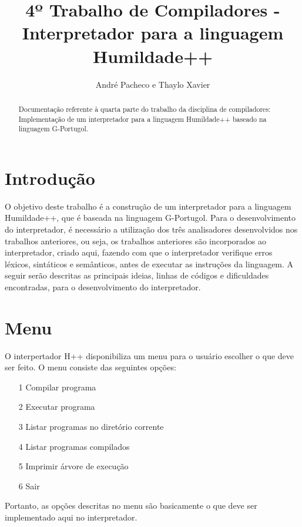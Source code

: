 \documentclass[a4paper,10pt]{article}
\title{4º Trabalho de Compiladores - Interpretador para a linguagem Humildade++}
\author{André Pacheco e Thaylo Xavier}
\begin{document}
\maketitle

\begin{abstract}
Documentação referente à quarta parte do trabalho da disciplina de compiladores: Implementação de um interpretador para a linguagem Humildade++ baseado na linguagem G-Portugol.
\end{abstract}

\section{Introdução}
O objetivo deste trabalho é a construção de um interpretador para a linguagem Humildade++, que é baseada na linguagem G-Portugol.
Para o desenvolvimento do interpretador, é necessário a utilização dos três analisadores desenvolvidos nos trabalhos anteriores, ou seja,
os trabalhos anteriores são incorporados ao interpretador, criado aqui, fazendo com que o interpretador verifique erros léxicos, sintáticos e
semânticos, antes de executar as instruções da linguagem. A seguir serão descritas as principais ideias, linhas de códigos e dificuldades
encontradas, para o desenvolvimento do interpretador.


\section{Menu}
	O interpertador H++ disponibiliza um menu para o usuário escolher o que deve ser feito. O menu consiste das seguintes opções:

\begin{enumerate}
 \item [1] Compilar programa
 \item [2] Executar programa
 \item [3] Listar programas no diretório corrente
 \item [4] Listar programas compilados
 \item [5] Imprimir árvore de execução
 \item [6] Sair 
\end{enumerate}

	Portanto, as opções descritas no menu são basicamente o que deve ser implementado aqui no interpretador.	
\end{document}
